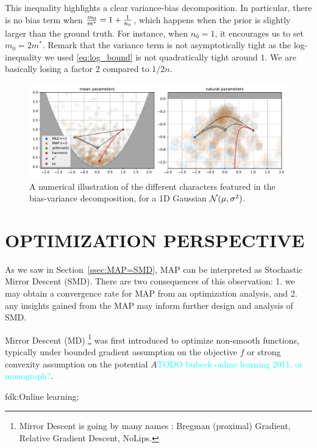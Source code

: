 \documentclass[twoside]{article}
\let\oldsection\section
\renewcommand{\section}[1]{\oldsection{\texorpdfstring{\uppercase{#1}}{#1}}}
\newcommand{\fdk}[1]{\textcolor{Periwinkle}{fdk:#1}}
\newcommand{\TODO}[1]{\textcolor{cyan}{TODO #1}}
\newcommand{\logpart}{A}
\newcommand{\m}{m}
\begin{document}
This inequality highlights a clear variance-bias decomposition.
In particular, there is no bias term when $\frac{\m_0}{\m^*} =1 + \inv{n_0} $, which happens when the prior is slightly larger than the ground truth.  For instance, when $n_0=1$, it encourages us to set $\m_0 = 2 \m^*$.
Remark that the variance term is not asymptotically tight as the log-inequality we used \eqref{eq:log_bound} is not quadratically tight around $1$. We are basically losing a factor 2 compared to $1/2n$.


\begin{figure}[t]
	\centering
	\includegraphics[width=\textwidth]{figs/thales/numerical_schema_n=3.pdf}
	\caption{A numerical illustration of the different characters featured in the bias-variance decomposition, for a 1D Gaussian ${\mathcal N}(\mu, \sigma^2)$.}
	\label{fig:bias-variance-numerical}
\end{figure}


\section{Optimization Perspective}
\label{sec:optimization}
As we saw in Section~\ref{ssec:MAP=SMD}, MAP can be interpreted as Stochastic Mirror Descent (SMD). 
There are two consequences of this observation: 1. we may obtain a convergence rate for MAP from an optimization analysis, and 2. any insights gained from the MAP may inform further design and analysis of SMD.

Mirror Descent (MD) \footnote{Mirror Descent is going by many names : Bregman (proximal) Gradient, Relative Gradient Descent, NoLips.} \citep{nemirovski1983problem, beck2003mirror} was first introduced to optimize non-smooth functions, typically under bounded gradient assumption on the objective $f$ or strong convexity assumption on the potential $\logpart$\citep{bubeck}\TODO{bubeck online learning 2011, or monograph?}.

\fdk{Online learning;
\citet{azoury2001relative,freund1996predicting,dasgupta2007online}
}
\end{document}

